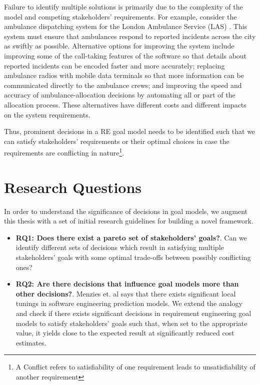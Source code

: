 Failure to identify multiple solutions is primarily due to the complexity of the model and competing stakeholders' requirements. For example, consider the ambulance dispatching system for the London Ambulance Service (LAS) \cite{finkelstein96}. This system must ensure that ambulances respond to reported incidents across the city as swiftly as possible. Alternative options for improving the system include improving some of the call-taking features of the software so that details about reported incidents can be encoded faster and more accurately; replacing ambulance radios with mobile data terminals so that more information can be communicated directly to the ambulance crews; and improving the speed and accuracy of ambulance-allocation decisions by automating all or part of the allocation process. These alternatives have different costs and different impacts on the system requirements.

Thus, prominent decisions in a RE goal model needs to be identified such that we can satisfy stakeholders' requirements or their optimal choices in case the requirements are conflicting in nature\footnote{A Conflict refers to satisfiability of one requirement leads to unsatisfiability of another requirement}.


\section{Research Questions}
\label{sec:intro:rq}
In order to understand the significance of decisions in goal models, we augment this thesis with a set of initial research guidelines for building a novel framework.

\begin{itemize}
    \item \textbf{RQ1: Does there exist a pareto set of stakeholders' goals?}. Can we identify different sets of decisions which result in satisfying multiple stakeholders' goals with some optimal trade-offs between possibly conflicting ones?
\end{itemize}

\begin{itemize}
    \item \textbf{RQ2: Are there decisions that influence goal models more than other decisions?}. Menzies et. al \cite{menzies07} says that there exists significant local tunings in software engineering prediction models. We extend the analogy and check if there exists significant decisions in requirement engineering goal models to satisfy stakeholders' goals such that, when set to the appropriate value, it yields close to the expected result at significantly reduced cost estimates.
\end{itemize}


